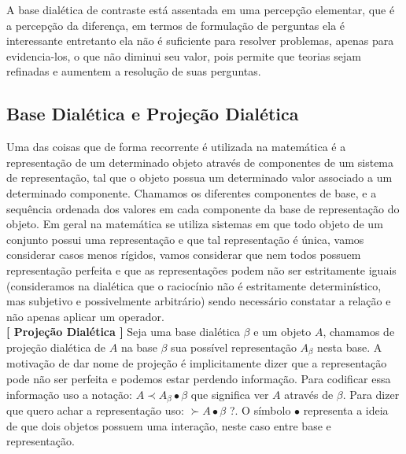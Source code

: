 \documentclass[10pt,a4paper]{report}
\begin{document}
A base dialética de contraste está assentada em uma percepção elementar, que é a percepção da diferença, em termos de formulação de perguntas ela é interessante entretanto ela não é suficiente para resolver problemas, apenas para evidencia-los, o que não diminui seu valor, pois permite que teorias sejam refinadas e aumentem a resolução de suas perguntas.




\subsection{Base Dialética e Projeção Dialética}

\hspace{\baselineskip}

Uma das coisas que de forma recorrente é utilizada na matemática é a representação de um determinado objeto através de componentes de um sistema de representação, tal que o objeto possua um determinado valor associado a um determinado componente. Chamamos os diferentes componentes de base, e a sequência ordenada dos valores em cada componente da base de representação do objeto. Em geral na matemática se utiliza sistemas em que todo objeto de um conjunto possui uma representação e que tal representação é única, vamos considerar casos menos rígidos, vamos considerar que nem todos possuem representação perfeita e que as representações podem não ser estritamente iguais (consideramos na dialética que o raciocínio não é estritamente determinístico, mas subjetivo e possivelmente arbitrário) sendo necessário constatar a relação e não apenas aplicar um operador.\\

\textbf{[ Projeção Dialética ]} Seja uma base dialética $ \beta $ e um objeto $A$, chamamos de projeção dialética de $A$ na base $\beta$ sua possível representação $A_{\beta}$ nesta base. A motivação de dar nome de projeção é implicitamente dizer que a representação pode não ser perfeita e podemos estar perdendo informação. Para codificar essa informação uso a notação: $ A \prec A_{\beta} \bullet \beta $ que significa ver $A$ através de $\beta$. Para dizer que quero achar a representação uso: $ \succ A \bullet \beta $ ?. O símbolo $\bullet$ representa a ideia de que dois objetos possuem uma interação, neste caso entre base e representação.\\
\end{document}
